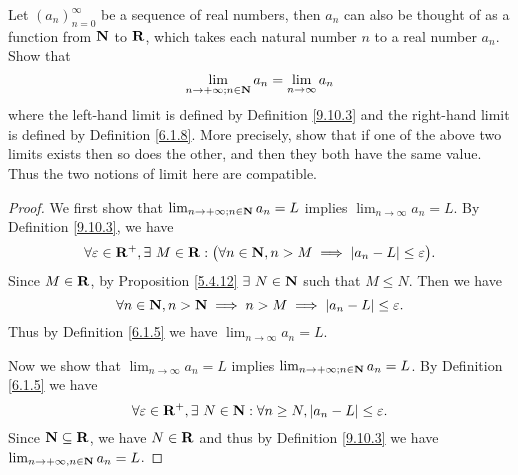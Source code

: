 \exercisesection

\begin{exercise}\label{ex 9.10.1}
    Let \((a_n)_{n = 0}^\infty\) be a sequence of real numbers, then \(a_n\) can also be thought of as a function from \(\mathbf{N}\) to \(\mathbf{R}\), which takes each natural number \(n\) to a real number \(a_n\).
    Show that
    \[
        \lim_{n \to +\infty ; n \in \mathbf{N}} a_n = \lim_{n \to \infty} a_n
    \]
    where the left-hand limit is defined by Definition \ref{9.10.3} and the right-hand limit is defined by Definition \ref{6.1.8}.
    More precisely, show that if one of the above two limits exists then so does the other, and then they both have the same value.
    Thus the two notions of limit here are compatible.
\end{exercise}

\begin{proof}
    We first show that \(\lim_{n \to +\infty ; n \in \mathbf{N}} a_n = L\) implies \(\lim_{n \to \infty} a_n = L\).
    By Definition \ref{9.10.3}, we have
    \[
        \forall \varepsilon \in \mathbf{R}^+, \exists\ M \in \mathbf{R} : \big(\forall n \in \mathbf{N}, n > M \implies \left\lvert a_n - L\right\rvert \leq \varepsilon\big).
    \]
    Since \(M \in \mathbf{R}\), by Proposition \ref{5.4.12} \(\exists\ N \in \N\) such that \(M \leq N\).
    Then we have
    \[
        \forall n \in \mathbf{N}, n > \mathbf{N} \implies n > M \implies \left\lvert a_n - L\right\rvert \leq \varepsilon.
    \]
    Thus by Definition \ref{6.1.5} we have \(\lim_{n \to \infty} a_n = L\).

    Now we show that \(\lim_{n \to \infty} a_n = L\) implies \(\lim_{n \to +\infty ; n \in \mathbf{N}} a_n = L\).
    By Definition \ref{6.1.5} we have
    \[
        \forall \varepsilon \in \mathbf{R}^+, \exists\ N \in \mathbf{N} : \forall n \geq N, \left\lvert a_n - L\right\rvert \leq \varepsilon.
    \]
    Since \(\mathbf{N} \subseteq \mathbf{R}\), we have \(N \in \mathbf{R}\) and thus by Definition \ref{9.10.3} we have \(\lim_{n \to +\infty, n \in \mathbf{N}} a_n = L\).
\end{proof}